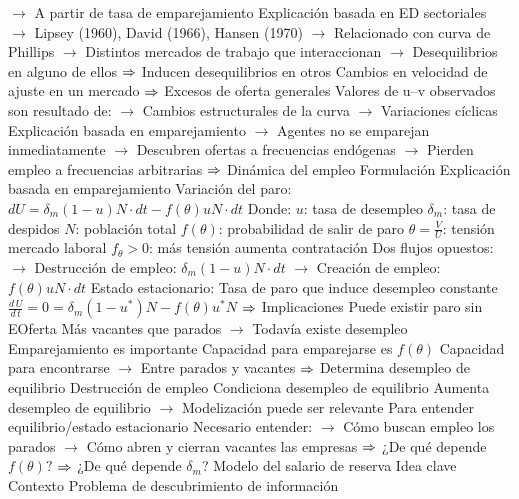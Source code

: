 \documentclass{nuevotema}
\begin{document}
\begin{esquemal}
				\4[] $\to$ A partir de tasa de emparejamiento
				\4[] Explicación basada en ED sectoriales
				\4[] $\to$ Lipsey (1960), David (1966), Hansen (1970)
				\4[] $\to$ Relacionado con curva de Phillips
				\4[] $\to$ Distintos mercados de trabajo que interaccionan
				\4[] $\to$ Desequilibrios en alguno de ellos
				\4[] $\Rightarrow$ Inducen desequilibrios en otros
				\4[] Cambios en velocidad de ajuste en un mercado
				\4[] $\Rightarrow$ Excesos de oferta generales
				\4[] Valores de u--v observados son resultado de:
				\4[] $\to$ Cambios estructurales de la curva
				\4[] $\to$ Variaciones cíclicas
				\4[] Explicación basada en emparejamiento
				\4[] $\to$ Agentes no se emparejan inmediatamente
				\4[] $\to$ Descubren ofertas a frecuencias endógenas
				\4[] $\to$ Pierden empleo a frecuencias arbitrarias
				\4[] $\Rightarrow$ Dinámica del empleo
			\3 Formulación
				\4 Explicación basada en emparejamiento
				\4 Variación del paro:
				\4[] $dU = \delta_m (1-u)N \cdot d t - f(\theta) u N \cdot d t$
				\4[] Donde:
				\4[] \quad $u$: tasa de desempleo
				\4[] \quad $\delta_m$: tasa de despidos
				\4[] \quad $N$: población total
				\4[] \quad $f(\theta)$: probabilidad de salir de paro
				\4[] \quad $\theta = \frac{V}{U}$: tensión mercado laboral
				\4[] \quad $f_\theta > 0$: más tensión aumenta contratación
				\4[] Dos flujos opuestos:
				\4[] $\to$ Destrucción de empleo: $\delta_m (1-u)N \cdot d t$
				\4[] $\to$ Creación de empleo: $f(\theta) u N \cdot d t$
				\4 Estado estacionario:
				\4[] Tasa de paro que induce desempleo constante
				\4[] $\frac{d \, U}{d \, t} = 0 = \delta_m (1-u^*) N - f(\theta) u^*N$
				\4[] $\Rightarrow$ 
			\3 Implicaciones
				\4 Puede existir paro sin EOferta
				\4[] Más vacantes que parados
				\4[] $\to$ Todavía existe desempleo
				\4 Emparejamiento es importante
				\4[] Capacidad para emparejarse es $f(\theta)$
				\4[] Capacidad para encontrarse
				\4[] $\to$ Entre parados y vacantes
				\4[] $\Rightarrow$ Determina desempleo de equilibrio
				\4 Destrucción de empleo
				\4[] Condiciona desempleo de equilibrio
				\4[] Aumenta desempleo de equilibrio
				\4[] $\to$ Modelización puede ser relevante
				\4 Para entender equilibrio/estado estacionario
				\4[] Necesario entender:
				\4[] $\to$ Cómo buscan empleo los parados
				\4[] $\to$ Cómo abren y cierran vacantes las empresas
				\4[] $\Rightarrow$ ¿De qué depende $f(\theta)?$
				\4[] $\Rightarrow$ ¿De qué depende $\delta_m$?
		\2 Modelo del salario de reserva
			\3 Idea clave
				\4 Contexto
				\4[] Problema de descubrimiento de información

\end{esquemal}
\end{document}
